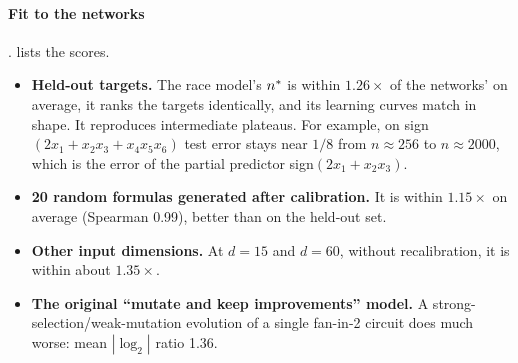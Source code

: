 \paragraph{Fit to the networks} .  lists the scores.
\begin{itemize}
\item \textbf{Held-out targets.} The race model's $n^{*}$ is within $1.26\times$ of the networks' on average, it ranks the targets identically, and its learning curves match in shape. It reproduces intermediate plateaus. For example, on sign$(2x_1+x_2x_3+x_4x_5x_6)$ test error stays near $1/8$ from $n\approx256$ to $n\approx2000$, which is the error of the partial predictor sign$(2x_1+x_2x_3)$.
\item \textbf{20 random formulas generated after calibration.} It is within $1.15\times$ on average (Spearman 0.99), better than on the held-out set.
\item \textbf{Other input dimensions.} At $d=15$ and $d=60$, without recalibration, it is within about $1.35\times$.
\item \textbf{The original ``mutate and keep improvements'' model.} A strong-selection/weak-mutation evolution of a single fan-in-2 circuit does much worse: mean $|\log_2|$ ratio 1.36.
\end{itemize}

